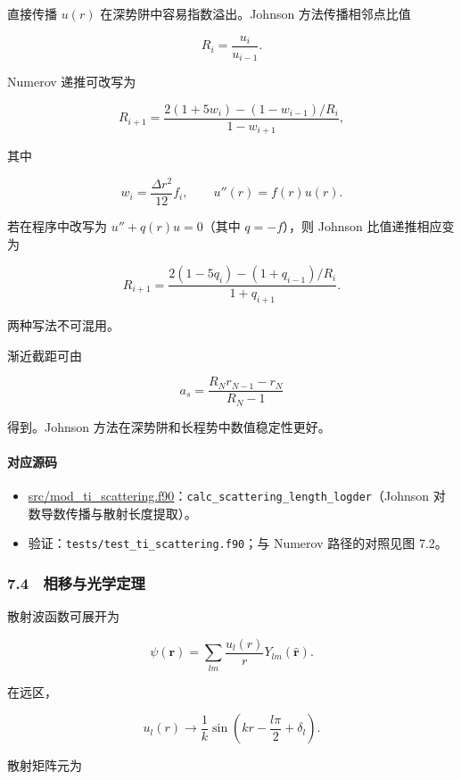 \documentclass[
]{ctexbook}
\providecommand{\tightlist}{%
  \setlength{\itemsep}{0pt}\setlength{\parskip}{0pt}}
\begin{document}
直接传播 \(u(r)\) 在深势阱中容易指数溢出。Johnson 方法传播相邻点比值

\[
R_i=\frac{u_i}{u_{i-1}}.
\]

Numerov 递推可改写为

\[
R_{i+1}
=
\frac{
2(1+5w_i)-(1-w_{i-1})/R_i
}
{1-w_{i+1}},
\]

其中

\[
w_i=\frac{\Delta r^2}{12}f_i,
\qquad
u''(r)=f(r)u(r).
\]

若在程序中改写为 \(u''+q(r)u=0\)（其中 \(q=-f\)），则 Johnson
比值递推相应变为

\[
R_{i+1}=\frac{2(1-5q_i)-(1+q_{i-1})/R_i}{1+q_{i+1}}.
\]

两种写法不可混用。

渐近截距可由

\[
a_s
=
\frac{R_Nr_{N-1}-r_N}{R_N-1}
\]

得到。Johnson 方法在深势阱和长程势中数值稳定性更好。

\hypertarget{ux5bf9ux5e94ux6e90ux7801-27}{%
\paragraph{对应源码}\label{ux5bf9ux5e94ux6e90ux7801-27}}

\begin{itemize}
\tightlist
\item
  \href{https://github.com/l1Ha/QuantumGeneralModule/blob/main/src/mod_ti_scattering.f90}{src/mod\_ti\_scattering.f90}：\texttt{calc\_scattering\_length\_logder}（Johnson
  对数导数传播与散射长度提取）。
\item
  验证：\texttt{tests/test\_ti\_scattering.f90}；与 Numerov
  路径的对照见图 7.2。
\end{itemize}

\hypertarget{ux76f8ux79fbux4e0eux5149ux5b66ux5b9aux7406}{%
\subsubsection{7.4　相移与光学定理}\label{ux76f8ux79fbux4e0eux5149ux5b66ux5b9aux7406}}

散射波函数可展开为

\[
\psi(\mathbf r)
=
\sum_{lm}
\frac{u_l(r)}{r}
Y_{lm}(\hat{\mathbf r}).
\]

在远区，

\[
u_l(r)
\rightarrow
\frac{1}{k}
\sin\left(kr-\frac{l\pi}{2}+\delta_l\right).
\]

散射矩阵元为
\end{document}
